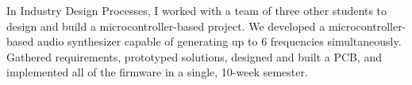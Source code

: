 {
    In Industry Design Processes, I worked with a team of three other students to design and build a microcontroller-based project. We developed a microcontroller-based audio synthesizer capable of generating up to 6 frequencies simultaneously. Gathered requirements, prototyped solutions, designed and built a PCB, and implemented all of the firmware in a single, 10-week semester.
}
